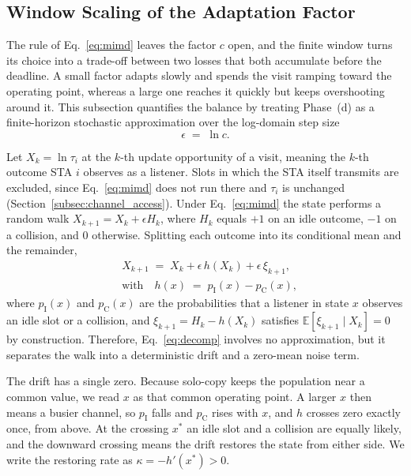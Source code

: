 \documentclass[journal,10pt]{IEEEtran}
\begin{document}
\subsection{Window Scaling of the Adaptation Factor}
\label{subsec:factor_scaling}

The rule of Eq.~\eqref{eq:mimd} leaves the factor $c$ open, and the finite window turns its choice into a trade-off between two losses that both accumulate before the deadline. A small factor adapts slowly and spends the visit ramping toward the operating point, whereas a large one reaches it quickly but keeps overshooting around it. This subsection quantifies the balance by treating Phase~(d) as a finite-horizon stochastic approximation over the log-domain step size
\begin{equation}
    \epsilon \;=\; \ln c.
    \label{eq:logstep}
\end{equation}

Let $X_k=\ln\tau_i$ at the $k$-th update opportunity of a visit, meaning the $k$-th outcome STA $i$ observes as a listener. Slots in which the STA itself transmits are excluded, since Eq.~\eqref{eq:mimd} does not run there and $\tau_i$ is unchanged (Section~\ref{subsec:channel_access}). Under Eq.~\eqref{eq:mimd} the state performs a random walk $X_{k+1}=X_k+\epsilon H_k$, where $H_k$ equals $+1$ on an idle outcome, $-1$ on a collision, and $0$ otherwise. Splitting each outcome into its conditional mean and the remainder,
\begin{equation}
    \begin{aligned}
    & X_{k+1} \;=\; X_k + \epsilon\,h(X_k) + \epsilon\,\xi_{k+1}, \\
    & \text{with} \quad h(x) \;=\; p_\mathrm{I}(x)-p_\mathrm{C}(x),
    \label{eq:decomp}
    \end{aligned}
\end{equation}
where $p_\mathrm{I}(x)$ and $p_\mathrm{C}(x)$ are the probabilities that a listener in state $x$ observes an idle slot or a collision, and $\xi_{k+1}=H_k-h(X_k)$ satisfies $\mathbb{E}[\xi_{k+1}\mid X_k]=0$ by construction. Therefore, Eq.~\eqref{eq:decomp} involves no approximation, but it separates the walk into a deterministic drift and a zero-mean noise term.

The drift has a single zero. Because solo-copy keeps the population near a common value, we read $x$ as that common operating point. A larger $x$ then means a busier channel, so $p_\mathrm{I}$ falls and $p_\mathrm{C}$ rises with $x$, and $h$ crosses zero exactly once, from above. At the crossing $x^*$ an idle slot and a collision are equally likely, and the downward crossing means the drift restores the state from either side. We write the restoring rate as $\kappa=-h'(x^*)>0$.
\end{document}
